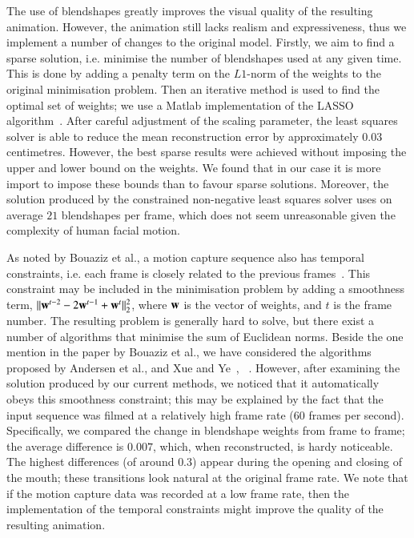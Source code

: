 The use of blendshapes greatly improves the visual quality of the resulting animation. However, the animation still lacks realism and expressiveness, thus we implement a number of changes to the original model. Firstly, we aim to find a sparse solution, i.e. minimise the number of blendshapes used at any given time. This is done by adding a penalty term on the $L1$-norm of the weights to the original minimisation problem. Then an iterative method is used to find the optimal set of weights; we use a Matlab implementation of the LASSO algorithm~\cite{Schmidt:2005}. After careful adjustment of the scaling parameter, the least squares solver is able to reduce the mean reconstruction error by approximately $0.03$ centimetres. However, the best sparse results were achieved without imposing the upper and lower bound on the weights. We found that in our case it is more import to impose these bounds than to favour sparse solutions. Moreover, the solution produced by the constrained non-negative least squares solver uses on average $21$ blendshapes per frame, which does not seem unreasonable given the complexity of human facial motion.

As noted by Bouaziz et al., a motion capture sequence also has temporal constraints, i.e. each frame is closely related to the previous frames~\cite{Bouaziz:2013}. This constraint may be included in the minimisation problem by adding a smoothness term, $||\mathbf{w}^{t-2} - 2 \mathbf{w}^{t-1} + \mathbf{w}^t||^2_2$, where $\mathbf{w}$ is the vector of weights, and $t$ is the frame number. The resulting problem is generally hard to solve, but there exist a number of algorithms that minimise the sum of Euclidean norms. Beside the one mention in the paper by Bouaziz et al., we have considered the algorithms proposed by Andersen et al., and Xue and Ye~\cite{Andersen:2000}, ~\cite{Xue:1997}. However, after examining the solution produced by our current methods, we noticed that it automatically obeys this smoothness constraint; this may be explained by the fact that the input sequence was filmed at a relatively high frame rate ($60$ frames per second). Specifically, we compared the change in blendshape weights from frame to frame; the average difference is $0.007$, which, when reconstructed, is hardy noticeable. The highest differences (of around $0.3$) appear during the opening and closing of the mouth; these transitions look natural at the original frame rate. We note that if the motion capture data was recorded at a low frame rate, then the implementation of the temporal constraints might improve the quality of the resulting animation.

